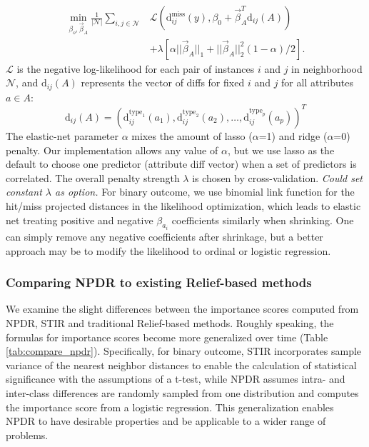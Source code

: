 \documentclass[10pt]{article}
\begin{document}
\begin{equation}\label{eq:glmnetNPDR}
\begin{aligned}
    \min_{\beta_o, \vec{\beta}_A} \frac{1}{|\mathcal{N}|}  \sum_{i,j \in \mathcal{N}} & 
           \mathcal{L} \left(\text{d}^{\text{miss}}_{ij}(y), \beta_0 + \vec{\beta}_A^{T} \text{d}_{ij}(A) \right)
     \\ \nonumber
     & + \lambda \left[ \alpha || \vec{\beta}_A ||_1 + || \vec{\beta}_A ||_2^2 (1-\alpha)/2  \right].
\end{aligned}
\end{equation}
$\mathcal{L}$ is the negative log-likelihood for each pair of instances $i$ and $j$ in neighborhood $\mathcal{N}$, and $\text{d}_{ij}(A)$ represents the vector of diffs for fixed $i$ and $j$ for all attributes $a \in A$: 
\begin{equation}
\text{d}_{ij}(A)= \left( \text{d}^{\text{type}_1}_{ij}(a_1), \text{d}^{\text{type}_2}_{ij}(a_2), \ldots, \text{d}^{\text{type}_p}_{ij}(a_p) \right)^{T}
\end{equation}
The elastic-net parameter $\alpha$ mixes the amount of lasso ($\alpha$=1) and ridge ($\alpha$=0) penalty. Our implementation allows any value of $\alpha$, but we use lasso as the default to choose one predictor (attribute diff vector) when a set of predictors is correlated. The overall penalty strength $\lambda$ is chosen by cross-validation.  {\it Could set constant $\lambda$ as option.} For binary outcome, we use binomial link function for the hit/miss projected distances in the likelihood optimization, which leads to elastic net treating positive and negative $\beta_{a_i}$ coefficients similarly when shrinking. One can simply remove any negative coefficients after shrinkage, but a better approach may be to modify the likelihood to ordinal or logistic regression.   

\subsubsection{Comparing NPDR to existing Relief-based methods}
We examine the slight differences between the importance scores computed from NPDR, STIR and traditional Relief-based methods.
Roughly speaking, the formulas for importance scores become more generalized over time (Table \ref{tab:compare_npdr}).
Specifically, for binary outcome, STIR incorporates sample variance of the nearest neighbor distances to enable the calculation of statistical significance with the assumptions of a t-test, while NPDR assumes intra- and inter-class differences are randomly sampled from one distribution and computes the importance score from a logistic regression. This generalization enables NPDR to have desirable properties and be applicable to a wider range of problems.
\end{document}

